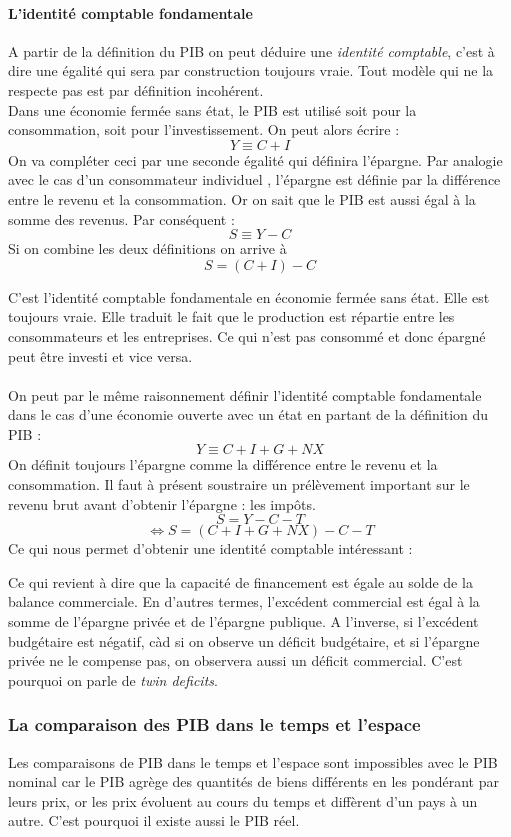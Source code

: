 \documentclass[10pt]{book}
\begin{document}
\paragraph{L'identité comptable fondamentale}
A partir de la définition du PIB on peut déduire une \textit{identité comptable}, c'est à dire une égalité qui sera par construction toujours vraie. Tout modèle qui ne la respecte pas est par définition incohérent. \\
Dans une économie fermée sans état, le PIB est utilisé soit pour la consommation, soit pour l'investissement. On peut alors écrire :
$$ Y \equiv C + I $$
On va compléter ceci par une seconde égalité qui définira l'épargne. Par analogie avec le cas d'un consommateur individuel , l'épargne est définie par la différence entre le revenu et la consommation. Or on sait que le PIB est aussi égal à la somme des revenus. Par conséquent :
$$  S \equiv Y-C $$
Si on combine les deux définitions on arrive à
$$ S = (C + I) - C $$ 
\begin{center}
\end{center}
C'est l'identité comptable fondamentale en économie fermée sans état. Elle est toujours vraie. Elle traduit le fait que le production est répartie entre les consommateurs et les entreprises. Ce qui n'est pas consommé et donc épargné peut être investi et vice versa. \\ \\
On peut par le même raisonnement définir l'identité comptable fondamentale dans le cas d'une économie ouverte avec un état en partant de la définition du PIB : 
$$ Y \equiv C + I + G + NX $$
On définit toujours l'épargne comme la différence entre le revenu et la consommation. Il faut à présent soustraire un prélèvement important sur le revenu brut avant d'obtenir l'épargne : les impôts.
$$ S = Y - C - T$$
$$ \Leftrightarrow S = (C + I + G + NX) - C - T$$
Ce qui nous permet d'obtenir une identité comptable intéressant : 
\begin{center}
\end{center}
Ce qui revient à dire que la capacité de financement est égale au solde de la balance commerciale. En d'autres termes, l'excédent commercial est égal à la somme de l'épargne privée et de l'épargne publique. A l'inverse, si l'excédent budgétaire est négatif, càd si on observe un déficit budgétaire, et si l'épargne privée ne le compense pas, on observera aussi un déficit commercial. C'est pourquoi on parle de \textit{twin deficits}.
\subsubsection{La comparaison des PIB dans le temps et l'espace}
Les comparaisons de PIB dans le temps et l'espace sont impossibles avec le PIB nominal car le PIB agrège des quantités de biens différents en les pondérant par leurs prix, or les prix évoluent au cours du temps et diffèrent d'un pays à un autre. C'est pourquoi il existe aussi le PIB réel.
\end{document}
